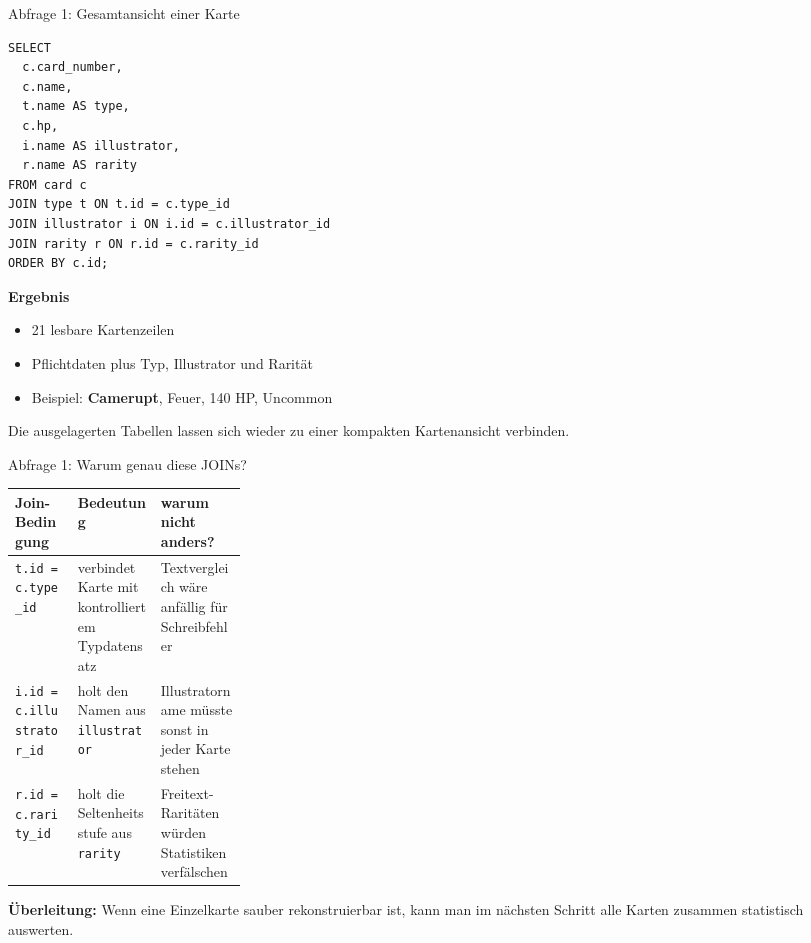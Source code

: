 \documentclass[aspectratio=169,11pt]{beamer}
\begin{document}
\begin{frame}[fragile,shrink=5]{Abfrage 1: Gesamtansicht einer Karte}
  \begin{minipage}[t]{0.55\textwidth}
    \begin{panel}
\begin{lstlisting}
SELECT
  c.card_number,
  c.name,
  t.name AS type,
  c.hp,
  i.name AS illustrator,
  r.name AS rarity
FROM card c
JOIN type t ON t.id = c.type_id
JOIN illustrator i ON i.id = c.illustrator_id
JOIN rarity r ON r.id = c.rarity_id
ORDER BY c.id;
\end{lstlisting}
    \end{panel}
  \end{minipage}\hfill
  \begin{minipage}[t]{0.41\textwidth}
    \begin{panel}[colback=softblue,colframe=blue!35]
      {\bfseries Ergebnis}\par
      \begin{itemize}
        \item 21 lesbare Kartenzeilen
        \item Pflichtdaten plus Typ, Illustrator und Rarit\"at
        \item Beispiel: \textbf{Camerupt}, Feuer, 140 HP, Uncommon
      \end{itemize}
      \vspace{0.2em}
      \small\color{muted}Die ausgelagerten Tabellen lassen sich wieder zu einer kompakten Kartenansicht verbinden.
    \end{panel}
  \end{minipage}
\end{frame}

\begin{frame}{Abfrage 1: Warum genau diese JOINs?}
  \begin{panel}
    \begin{tabularx}{\linewidth}{@{}L{0.27\linewidth}Y Y@{}}
      \toprule
      \textbf{Join-Bedingung} & \textbf{Bedeutung} & \textbf{warum nicht anders?} \\
      \midrule
      \texttt{t.id = c.type\_id} & verbindet Karte mit kontrolliertem Typdatensatz & Textvergleich w\"are anf\"allig f\"ur Schreibfehler \\
      \texttt{i.id = c.illustrator\_id} & holt den Namen aus \texttt{illustrator} & Illustratorname m\"usste sonst in jeder Karte stehen \\
      \texttt{r.id = c.rarity\_id} & holt die Seltenheitsstufe aus \texttt{rarity} & Freitext-Rarit\"aten w\"urden Statistiken verf\"alschen \\
      \bottomrule
    \end{tabularx}
  \end{panel}
  \vspace{0.35cm}
  \begin{panel}[colback=softgold,colframe=gold!45]
    {\bfseries \"Uberleitung:} Wenn eine Einzelkarte sauber rekonstruierbar ist, kann man im n\"achsten Schritt alle Karten zusammen statistisch auswerten.
  \end{panel}
\end{frame}
\end{document}
